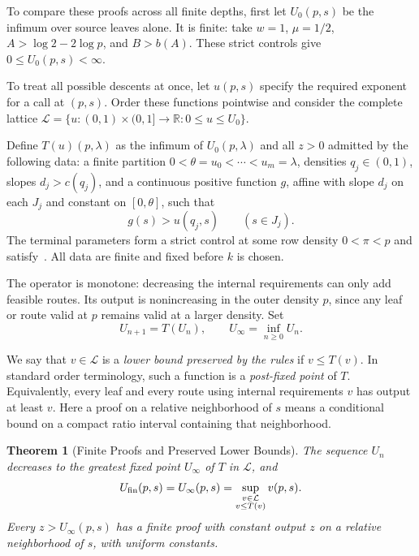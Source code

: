 \documentclass[11pt]{article}
\newtheorem{theorem}{Theorem}
\theoremstyle{definition}
\begin{document}
To compare these proofs across all finite depths, first let $U_0(p,s)$ be the infimum over source leaves alone.
It is finite: take $w=1$, $\mu=1/2$, $A>\log2-2\log p$, and $B>b(A)$.
These strict controls give $0\le U_0(p,s)<\infty$.


To treat all possible descents at once, let $u(p,s)$ specify the required exponent for a call at $(p,s)$.
Order these functions pointwise and consider the complete lattice
$\mathcal L=\{u:(0,1)\times(0,1]\to\mathbb R:0\le u\le U_0\}$.

Define $T(u)(p,\lambda)$ as the infimum of $U_0(p,\lambda)$ and all $z>0$ admitted by the following data:
a finite partition $0<\theta=u_0<\cdots<u_m=\lambda$, densities $q_j\in(0,1)$, slopes $d_j>c(q_j)$, and a continuous positive function $g$, affine with slope $d_j$ on each $J_j$ and constant on $[0,\theta]$, such that
\begin{equation}\label{eq:oracle}
 g(s)>u(q_j,s)\qquad(s\in J_j).
\end{equation}
The terminal parameters form a strict control at some row density $0<\pi<p$ and satisfy~.
All data are finite and fixed before $k$ is chosen.

The operator is monotone: decreasing the internal requirements can only add feasible routes.
Its output is nonincreasing in the outer density $p$, since any leaf or route valid at $p$ remains valid at a larger density.
Set
\[
 U_{n+1}=T(U_n),\qquad U_\infty=\inf_{n\ge0}U_n.
\]

We say that $v\in\mathcal L$ is a \emph{lower bound preserved by the rules} if $v\le T(v)$.
In standard order terminology, such a function is a \emph{post-fixed point} of $T$.
Equivalently, every leaf and every route using internal requirements $v$ has output at least $v$.
Here a proof on a relative neighborhood of $s$ means a conditional bound on a compact ratio interval containing that neighborhood.

\begin{theorem}[Finite Proofs and Preserved Lower Bounds]\label{thm:closure}
The sequence $U_n$ decreases to the greatest fixed point $U_\infty$ of $T$ in $\mathcal L$, and
\begin{equation}\label{eq:characterization}
 U_{\rm fin}(p,s)=U_\infty(p,s)
 =\sup_{\substack{v\in\mathcal L\\v\le T(v)}}v(p,s).
\end{equation}
Every $z>U_\infty(p,s)$ has a finite proof with constant output $z$ on a relative neighborhood of $s$, with uniform constants.
\end{theorem}
\end{document}

